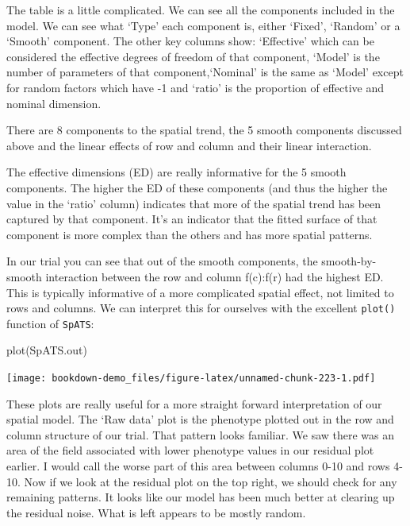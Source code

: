 \documentclass[
]{book}
\newenvironment{Shaded}{\begin{snugshade}}{\end{snugshade}}
\newcommand{\FunctionTok}[1]{\textcolor[rgb]{0.00,0.00,0.00}{#1}}
\newcommand{\NormalTok}[1]{#1}
\begin{document}
The table is a little complicated. We can see all the components included in the model. We can see what `Type' each component is, either `Fixed', `Random' or a `Smooth' component. The other key columns show: `Effective' which can be considered the effective degrees of freedom of that component, `Model' is the number of parameters of that component,`Nominal' is the same as `Model' except for random factors which have -1 and `ratio' is the proportion of effective and nominal dimension.

There are 8 components to the spatial trend, the 5 smooth components discussed above and the linear effects of row and column and their linear interaction.

The effective dimensions (ED) are really informative for the 5 smooth components. The higher the ED of these components (and thus the higher the value in the `ratio' column) indicates that more of the spatial trend has been captured by that component. It's an indicator that the fitted surface of that component is more complex than the others and has more spatial patterns.

In our trial you can see that out of the smooth components, the smooth-by-smooth interaction between the row and column f(c):f(r) had the highest ED. This is typically informative of a more complicated spatial effect, not limited to rows and columns. We can interpret this for ourselves with the excellent \texttt{plot()} function of \texttt{SpATS}:

\begin{Shaded}
\begin{Highlighting}[]
\FunctionTok{plot}\NormalTok{(SpATS.out)}
\end{Highlighting}
\end{Shaded}

\texttt{[image: bookdown-demo\_files/figure-latex/unnamed-chunk-223-1.pdf]}

These plots are really useful for a more straight forward interpretation of our spatial model. The `Raw data' plot is the phenotype plotted out in the row and column structure of our trial. That pattern looks familiar. We saw there was an area of the field associated with lower phenotype values in our residual plot earlier. I would call the worse part of this area between columns 0-10 and rows 4-10. Now if we look at the residual plot on the top right, we should check for any remaining patterns. It looks like our model has been much better at clearing up the residual noise. What is left appears to be mostly random.
\end{document}
